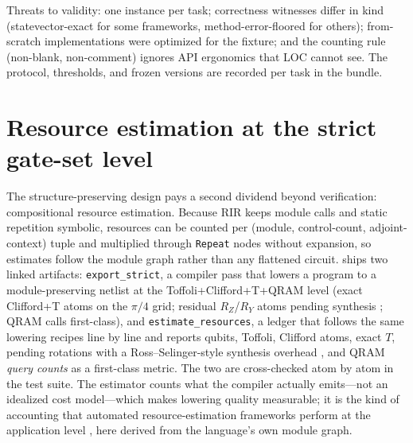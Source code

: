 Threats to validity: one instance per task; correctness witnesses differ
in kind (statevector-exact for some frameworks, method-error-floored for
others); from-scratch implementations were optimized for the fixture; and
the counting rule (non-blank, non-comment) ignores API ergonomics that
LOC cannot see.  The protocol, thresholds, and frozen versions are
recorded per task in the bundle.

\section{Resource estimation at the strict gate-set level}
\label{sec:resources}

The structure-preserving design pays a second dividend beyond
verification: compositional resource estimation.  Because RIR keeps module
calls and static repetition symbolic, resources can be counted per
(module, control-count, adjoint-context) tuple and multiplied through \texttt{Repeat} nodes
without expansion, so estimates follow the module graph rather than any
flattened circuit.  \pqlang{} ships two linked artifacts:
\texttt{export\_strict}, a compiler pass that lowers a program to a
module-preserving netlist at the Toffoli+Clifford+T+QRAM level (exact
Clifford+T atoms on the $\pi/4$ grid; residual $R_Z$/$R_Y$ atoms pending
synthesis \cite{ross2016optimal}; QRAM calls first-class), and
\texttt{estimate\_resources}, a ledger that follows the same lowering
recipes line by line and reports qubits, Toffoli, Clifford atoms, exact $T$,
pending rotations with a Ross--Selinger-style synthesis overhead
\cite{ross2016optimal}, and QRAM \emph{query counts} as a first-class
metric.  The two are cross-checked atom by atom in the test suite.  The
estimator counts what the compiler actually emits---not an idealized cost
model---which makes lowering quality measurable; it is the kind of
accounting that automated resource-estimation frameworks perform at the
application level
\cite{beverland2022assessing,harrigan2024qualtran,su2026resource,gidney2025rsa},
here derived from the language's own module graph.

